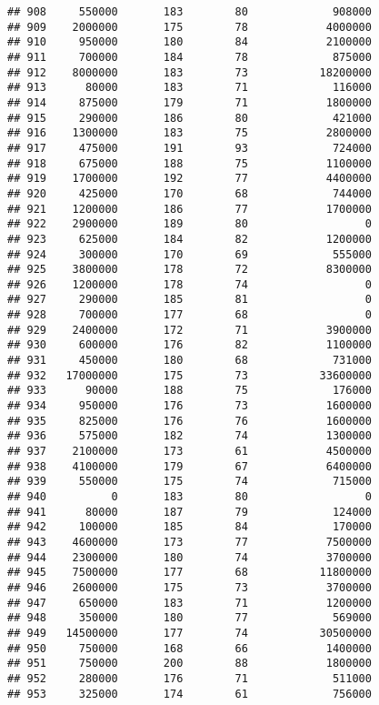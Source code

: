 \documentclass[
]{article}
\begin{document}
\begin{verbatim}
## 908     550000       183        80             908000
## 909    2000000       175        78            4000000
## 910     950000       180        84            2100000
## 911     700000       184        78             875000
## 912    8000000       183        73           18200000
## 913      80000       183        71             116000
## 914     875000       179        71            1800000
## 915     290000       186        80             421000
## 916    1300000       183        75            2800000
## 917     475000       191        93             724000
## 918     675000       188        75            1100000
## 919    1700000       192        77            4400000
## 920     425000       170        68             744000
## 921    1200000       186        77            1700000
## 922    2900000       189        80                  0
## 923     625000       184        82            1200000
## 924     300000       170        69             555000
## 925    3800000       178        72            8300000
## 926    1200000       178        74                  0
## 927     290000       185        81                  0
## 928     700000       177        68                  0
## 929    2400000       172        71            3900000
## 930     600000       176        82            1100000
## 931     450000       180        68             731000
## 932   17000000       175        73           33600000
## 933      90000       188        75             176000
## 934     950000       176        73            1600000
## 935     825000       176        76            1600000
## 936     575000       182        74            1300000
## 937    2100000       173        61            4500000
## 938    4100000       179        67            6400000
## 939     550000       175        74             715000
## 940          0       183        80                  0
## 941      80000       187        79             124000
## 942     100000       185        84             170000
## 943    4600000       173        77            7500000
## 944    2300000       180        74            3700000
## 945    7500000       177        68           11800000
## 946    2600000       175        73            3700000
## 947     650000       183        71            1200000
## 948     350000       180        77             569000
## 949   14500000       177        74           30500000
## 950     750000       168        66            1400000
## 951     750000       200        88            1800000
## 952     280000       176        71             511000
## 953     325000       174        61             756000

\end{verbatim}
\end{document}
